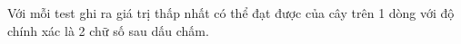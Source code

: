 Với mỗi test ghi ra giá trị thấp nhất có thể đạt được của cây trên 1 dòng với độ chính xác là 2 chữ số sau dấu chấm.  

\